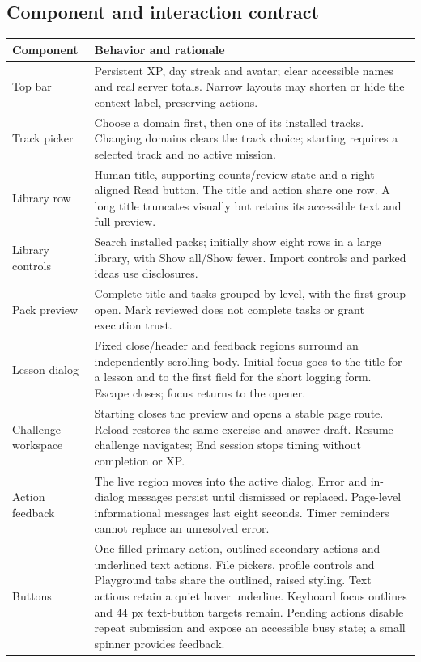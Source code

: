 \subsection{Component and interaction contract}
\begin{longtable}{P{.22\textwidth}P{.70\textwidth}}
\textbf{Component} & \textbf{Behavior and rationale}\\\hline
Top bar & Persistent XP, day streak and avatar; clear accessible names and real server totals. Narrow layouts may shorten or hide the context label, preserving actions.\\
Track picker & Choose a domain first, then one of its installed tracks. Changing domains clears the track choice; starting requires a selected track and no active mission.\\
Library row & Human title, supporting counts/review state and a right-aligned Read button. The title and action share one row. A long title truncates visually but retains its accessible text and full preview.\\
Library controls & Search installed packs; initially show eight rows in a large library, with Show all/Show fewer. Import controls and parked ideas use disclosures.\\
Pack preview & Complete title and tasks grouped by level, with the first group open. Mark reviewed does not complete tasks or grant execution trust.\\
Lesson dialog & Fixed close/header and feedback regions surround an independently scrolling body. Initial focus goes to the title for a lesson and to the first field for the short logging form. Escape closes; focus returns to the opener.\\
Challenge workspace & Starting closes the preview and opens a stable page route. Reload restores the same exercise and answer draft. Resume challenge navigates; End session stops timing without completion or XP.\\
Action feedback & The live region moves into the active dialog. Error and in-dialog messages persist until dismissed or replaced. Page-level informational messages last eight seconds. Timer reminders cannot replace an unresolved error.\\
Buttons & One filled primary action, outlined secondary actions and underlined text actions. File pickers, profile controls and Playground tabs share the outlined, raised styling. Text actions retain a quiet hover underline. Keyboard focus outlines and 44 px text-button targets remain. Pending actions disable repeat submission and expose an accessible busy state; a small spinner provides feedback.\\

\end{longtable}
